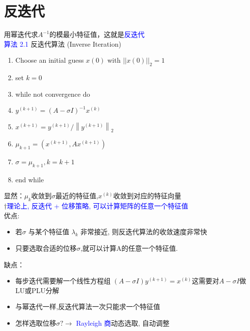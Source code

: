 \documentclass[12pt,a4paper]{article}
\begin{document}
\section{反迭代}
\noindent 用幂迭代求$A^{-1}$的模最小特征值，这就是\textcolor{blue}{反迭代}\\
\textcolor{blue}{算法 2.1} 反迭代算法 (Inverse Iteration)\\
\begin{enumerate}[1:]
\item Choose an initial guess $x(0)$ with $||x(0)||_{2} = 1$
\item set $k=0$
\item while not convergence do
\item \qquad$y^{(k+1)} = (A-\sigma I)^{-1}x^{(k)}$
\item \qquad$x^{(k+1)}=y^{(k+1)} /\left\|y^{(k+1)}\right\|_{2}$
\item \qquad$\mu_{k+1}=\left(x^{(k+1)}, A x^{(k+1)}\right)$
\item \qquad$\sigma=\mu_{k+1},k=k+1$
\item end while
\end{enumerate}
显然：$\mu_{k}$收敛到$\sigma$最近的特征值,$x^({k})$收敛到对应的特征向量\\
$\dagger$\textcolor{blue}{理论上, 反迭代 + 位移策略, 可以计算矩阵的任意一个特征值}\\
优点:
\begin{itemize}
\item 若$\sigma$ 与某个特征值 $\lambda_{k}$ 非常接近, 则反迭代算法的收敛速度非常快
\item 只要选取合适的位移$\sigma$,就可以计算A的任意一个特征值.
\end{itemize}
缺点：
\begin{itemize}
\item 每步迭代需要解一个线性方程组 $(A-\sigma I) y^{(k+1)}=x^{(k)}$这需要对$A-\sigma I$做LU或PLU分解
\item 与幂迭代一样,反迭代算法一次只能求一个特征值
\item 怎样选取位移$\sigma ? \rightarrow$ \textcolor{blue}{Rayleigh 商}动态选取, 自动调整
\end{itemize}
\end{document}
